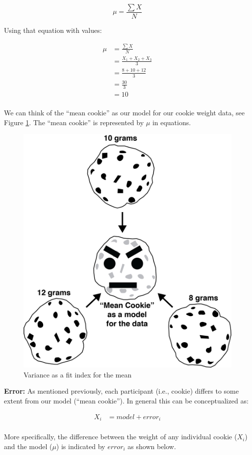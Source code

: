\documentclass[
]{krantz}
\begin{document}
\begin{equation} 
\mu = \frac{\sum{X}}{N}
      \label{eq:popmeanch4}
\end{equation}

Using that equation with values:

\[
\begin{aligned} 
\mu &= \frac{\sum{X}}{N} \\
&= \frac{X_1 + X_2 + X_3}{3}\\ 
&= \frac{8 + 10 + 12}{3}\\
&= \frac{30}{3}\\
&= 10\\
\end{aligned} 
\]

We can think of the ``mean cookie'' as our model for our cookie weight data, see Figure \ref{fig:meancookie}. The ``mean cookie'' is represented by \(\mu\) in equations.

\begin{figure}
\includegraphics[width=0.6\linewidth]{ch_populations/images/cookie} \caption{Variance as a fit index for the mean}\label{fig:meancookie}
\end{figure}

\textbf{Error:} As mentioned previously, each participant (i.e., cookie) differs to some extent from our model (``mean cookie''). In general this can be conceptualized as:

\[
\begin{aligned} 
X_i &= model + error_i \\
\end{aligned} 
\]

More specifically, the difference between the weight of any individual cookie (\(X_i\)) and the model (\(\mu\)) is indicated by \(error_i\) as shown below.
\end{document}

